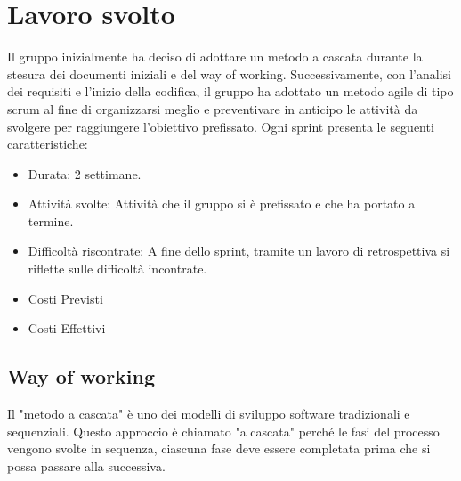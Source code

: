 \section{Lavoro svolto}
Il gruppo inizialmente ha deciso di adottare un metodo a cascata durante la stesura dei documenti iniziali e del way of working. 
Successivamente, con l'analisi dei requisiti e l'inizio della codifica, il gruppo ha adottato un metodo agile di tipo scrum al fine di organizzarsi meglio e preventivare in anticipo le attività da svolgere per raggiungere l'obiettivo prefissato.
Ogni sprint presenta le seguenti caratteristiche:
\begin{itemize}
    \item{Durata:} 2 settimane.
    \item{Attività svolte:} Attività che il gruppo si è prefissato e che ha portato a termine.
    \item{Difficoltà riscontrate:} A fine dello sprint, tramite un lavoro di retrospettiva si riflette sulle difficoltà incontrate.
    \item{Costi Previsti}
    \item{Costi Effettivi}
\end{itemize}

\subsection{Way of working}
Il "metodo a cascata" è uno dei modelli di sviluppo software tradizionali e sequenziali. Questo approccio è chiamato "a cascata" perché le fasi del processo vengono svolte in sequenza, ciascuna fase deve essere completata prima che si possa passare alla successiva. 


